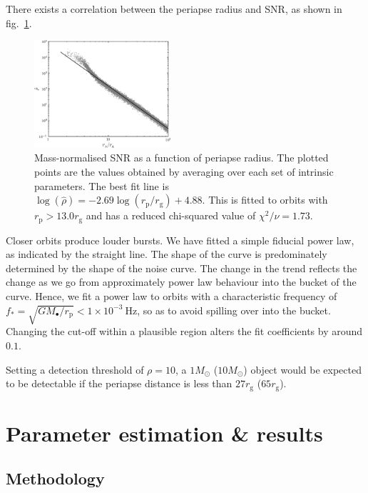 \documentclass[11pt,twoside]{article}
\begin{document}
There exists a correlation between the periapse radius and SNR, as shown in fig.~\ref{fig:SNR}.
\begin{figure}[ht!]
  \begin{center}
  \includegraphics[width=0.45\textwidth]{Fig_SNR}
    \caption{Mass-normalised SNR as a function of periapse radius. The plotted points are the values obtained by averaging over each set of intrinsic parameters. The best fit line is $\log(\hat{\rho}) = -2.69\log(r_\mathrm{p}/r_\mathrm{g}) + 4.88$. This is fitted to orbits with $r_\mathrm{p} >  13.0 r_\mathrm{g}$ and has a reduced chi-squared value of $\chi^2/\nu = 1.73$.}
    \label{fig:SNR}
  \end{center}
\end{figure}
Closer orbits produce louder bursts. We have fitted a simple fiducial power law, as indicated by the straight line. The shape of the curve is predominately determined by the shape of the noise curve. The change in the trend reflects the change as we go from approximately power law behaviour into the bucket of the curve. Hence, we fit a power law to orbits with a characteristic frequency of $f_\ast = \sqrt{GM_\bullet/r_\mathrm{p}} < 1 \times 10^{-3}~\mathrm{Hz}$, so as to avoid spilling over into the bucket. Changing the cut-off within a plausible region alters the fit coefficients by around $0.1$.

Setting a detection threshold of $\rho = 10$, a $1 M_\odot$ ($10 M_\odot$) object would be expected to be detectable if the periapse distance is less than $27 r_\mathrm{g}$ ($65 r_\mathrm{g}$).

\section{Parameter estimation \& results}\label{sec:Estimation}

\subsection{Methodology}
\end{document}
